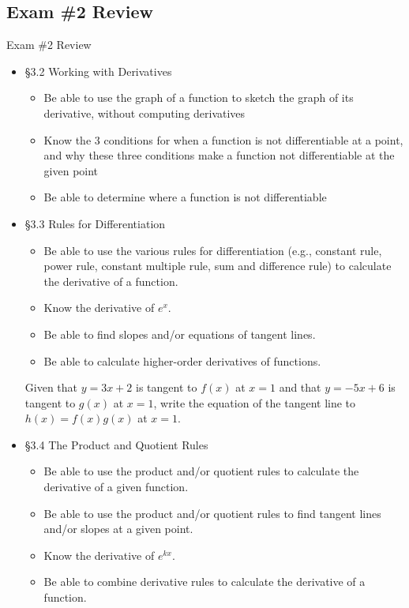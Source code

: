 \documentclass[cal1spr16Lectures.tex]{subfiles}
\begin{document}
\subsection{Exam \#2 Review}
\begin{frame}[allowframebreaks]{Exam \#2 Review}
\begin{itemize}
\item \S 3.2 Working with Derivatives
	\begin{itemize}
	\item Be able to use the graph of a function to sketch the graph of its derivative, without computing derivatives
	\item Know the 3 conditions for when a function is not differentiable at a point, and why these three conditions make a function not differentiable at the given point
	\item Be able to determine where a function is not differentiable
	\end{itemize}
%
\framebreak	
\item \S 3.3 Rules for Differentiation
	\begin{itemize}\footnotesize
	\item Be able to use the various rules for differentiation (e.g., constant rule, power rule, constant multiple rule, sum and difference rule) to calculate the derivative of a function.
	\item Know the derivative of $e^x$.
	\item Be able to find slopes and/or equations of tangent lines.
	\item Be able to calculate higher-order derivatives of functions.
	\end{itemize}
%
\framebreak
\begin{exe}
Given that $y=3x+2$ is tangent to $f(x)$ at $x=1$ and that $y=-5x+6$ is tangent to $g(x)$ at $x=1$, write the equation of the tangent line to $h(x)=f(x)g(x)$ at $x=1$.
\end{exe}
%
\framebreak
\item \S 3.4 The Product and Quotient Rules
	\begin{itemize}\footnotesize
	\item Be able to use the product and/or quotient rules to calculate the derivative of a given function.
	\item Be able to use the product and/or quotient rules to find tangent lines and/or slopes at a given point.
	\item Know the derivative of $e^{kx}$.
	\item Be able to combine derivative rules to calculate the derivative of a function.
	\end{itemize}
	

\end{itemize}
\end{frame}
\end{document}
